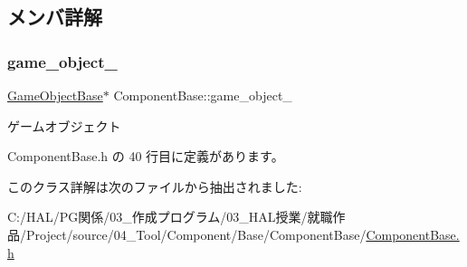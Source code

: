\subsection{メンバ詳解}
\mbox{\label{class_component_base_a60a43b42437cd5be2b05d2f4f4dd8147}} 
\subsubsection{\texorpdfstring{game\+\_\+object\+\_\+}{game\_object\_}}
{\footnotesize\ttfamily \mbox{\hyperlink{class_game_object_base}{Game\+Object\+Base}}$\ast$ Component\+Base\+::game\+\_\+object\+\_\+\hspace{0.3cm}{\ttfamily [private]}}



ゲームオブジェクト 



 Component\+Base.\+h の 40 行目に定義があります。



このクラス詳解は次のファイルから抽出されました\+:\begin{DoxyCompactItemize}
\item 
C\+:/\+H\+A\+L/\+P\+G関係/03\+\_\+作成プログラム/03\+\_\+\+H\+A\+L授業/就職作品/\+Project/source/04\+\_\+\+Tool/\+Component/\+Base/\+Component\+Base/\mbox{\hyperlink{_component_base_8h}{Component\+Base.\+h}}\end{DoxyCompactItemize}
